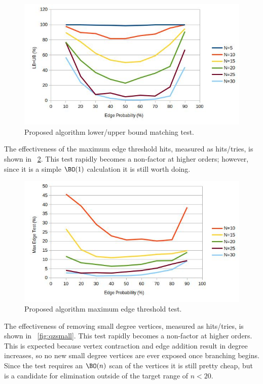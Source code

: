 \begin{figure}[H]
  \centering
  \includegraphics[width=5in]{qz_match}
  \caption{Proposed algorithm lower/upper bound matching test.}
  \label{fig:qzmatch}
\end{figure}

The effectiveness of the maximum edge threshold hits, measured as hits/tries, is shown in
\figurename~\ref{fig:qzedges}.  This test rapidly becomes a non-factor at higher orders; however, since it is a
simple \(\BO(1)\) calculation it is still worth doing.

\begin{figure}[H]
  \centering
  \includegraphics[width=5in]{qz_edges}
  \caption{Proposed algorithm maximum edge threshold test.}
  \label{fig:qzedges}
\end{figure}

The effectiveness of removing small degree vertices, measured as hits/tries, is shown in
\figurename~\ref{fig:qzsmall}.  This test rapidly becomes a non-factor at higher orders.  This is expected because
vertex contraction and edge addition result in degree increases, so no new small degree vertices are ever exposed
once branching begins.  Since the test requires an \(\BO(n)\) scan of the vertices it is still pretty cheap, but is
a candidate for elimination outside of the target range of \(n<20\).

